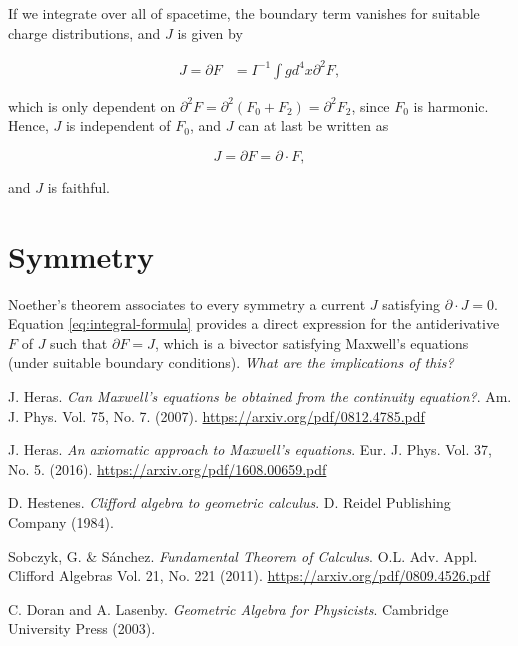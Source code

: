 \documentclass{article}
\begin{document}
If we integrate over all of spacetime, the boundary term vanishes for suitable charge distributions, and $J$ is given by

\begin{align}
  J = \partial F &= I^{-1} \int g d^{4}x \partial^2 F,
\end{align}

which is only dependent on $\partial^2 F = \partial^2 (F_0 + F_2) = \partial^2 F_2$, since $F_0$ is harmonic. Hence, $J$ is independent of $F_0$, and $J$ can at last be written as 

\begin{equation}
  J = \partial F = \partial \cdot F,
\end{equation}

and $J$ is faithful.

\section{Symmetry}

Noether's theorem associates to every symmetry a current $J$ satisfying $\partial \cdot J = 0$. Equation \ref{eq:integral-formula} provides a direct expression for the antiderivative $F$ of $J$ such that $\partial F = J$, which is a bivector satisfying Maxwell's equations (under suitable boundary conditions). \emph{What are the implications of this?}


  \begin{thebibliography}{9} 

      J. Heras.
      \emph{Can Maxwell’s equations be obtained from the continuity equation?}.
      Am. J. Phys. Vol. 75, No. 7. (2007).
      \url{https://arxiv.org/pdf/0812.4785.pdf}

      J. Heras.
      \emph{An axiomatic approach to Maxwell’s equations}.
      Eur. J. Phys. Vol. 37, No. 5. (2016).
      \url{https://arxiv.org/pdf/1608.00659.pdf}

      D. Hestenes.
      \emph{Clifford algebra to geometric calculus}.
      D. Reidel Publishing Company (1984).

      Sobczyk, G. \& S\'anchez.
      \emph{Fundamental Theorem of Calculus}.
      O.L. Adv. Appl. Clifford Algebras Vol. 21, No. 221 (2011).
      \url{https://arxiv.org/pdf/0809.4526.pdf}

      C. Doran and A. Lasenby.
      \emph{Geometric Algebra for Physicists}. Cambridge University Press (2003).




  \end{thebibliography}
\end{document}
